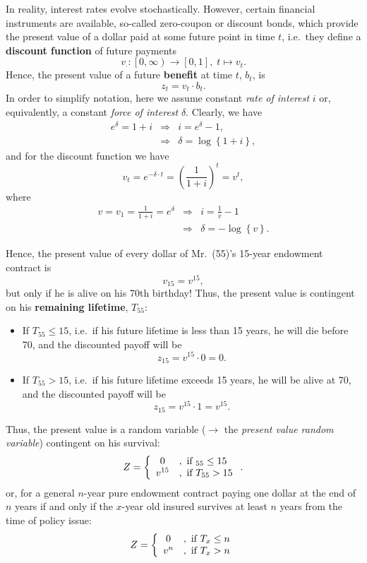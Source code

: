 \documentclass[11pt,fleqn,oneside]{book}
\begin{document}
In reality, interest rates evolve stochastically. However, certain financial instruments are available, so-called zero-coupon or discount bonds, which provide the present value of a dollar paid at some future point in time $t$, i.e.\ they define a \textbf{discount function} of future payments
$$
v_{\cdot}: \left[0,\infty \right) \longrightarrow [0,1],\;t \mapsto v_t.
$$
Hence, the present value of a future \textbf{benefit} at time $t$, $b_t$, is
$$
z_t = v_t \cdot b_t.
$$
In order to simplify notation, here we assume constant \textit{rate of interest} $i$ or, equivalently, a constant \textit{force of interest} $\delta$. Clearly, we have
\begin{eqnarray*}
e^{\delta} = 1 + i &\Rightarrow& i = e^{\delta} - 1,\\
&\Rightarrow& \delta = \log\left\{1+i \right\},
\end{eqnarray*}
and for the discount function we have
$$
v_t = e^{-\delta \cdot t} = \left(\frac{1}{1+i}\right)^t = v^t,
$$
where
\begin{eqnarray*}
v = v_1 = \frac{1}{1+i} = e^{\delta} &\Rightarrow& i = \frac{1}{v} - 1\\
&\Rightarrow&  \delta = - \log\left\{v\right\}.
\end{eqnarray*}

Hence, the present value of every dollar of Mr.\ (55)'s 15-year endowment contract is 
$$
v_{15} = v^{15}, 
$$
but only if he is alive on his 70th birthday! Thus, the present value is contingent on his \textbf{remaining lifetime}, $T_{55}$:
\begin{itemize}
\item If $T_{55} \leq 15$, i.e.\ if his future lifetime is less than 15 years, he will die before 70, and the discounted payoff will be
$$
z_{15} = v^{15}\cdot 0 = 0.
$$
\item If $T_{55}>15$, i.e.\ if his future lifetime exceeds 15 years, he will be alive at 70, and the discounted payoff will be
$$
z_{15} = v^{15} \cdot 1 = v^{15}.
$$
\end{itemize}
Thus, the present value is a random variable ($\rightarrow$ the \textit{present value random variable}) contingent on his survival:
$$
Z = \left\{
\begin{array}{c l}
0 & ,\text{ if }_{55} \leq 15 \\
v^{15} &, \text{ if }T_{55} > 15
\end{array}
\right. .
$$
or, for a general $n$-year pure endowment contract paying one dollar at the end of $n$ years if and only if the $x$-year old insured survives at least $n$ years from the time of policy issue:
$$
Z = \left\{
\begin{array}{c l}
0 & ,\text{ if }T_x \leq n \\
v^{n} &, \text{ if }T_x > n
\end{array}
\right.
$$
\end{document}
